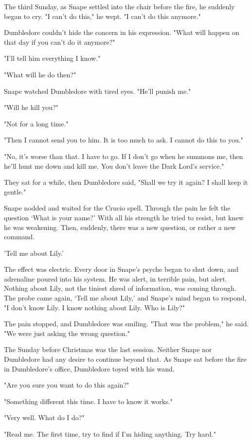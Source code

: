 \documentclass[a4paper,11pt]{article}
\begin{document}
The third Sunday, as Snape settled into the chair before the fire, he suddenly began to cry. "I can't do this," he wept. "I can't do this anymore."

Dumbledore couldn't hide the concern in his expression. "What will happen on that day if you can't do it anymore?"

"I'll tell him everything I know."

"What will he do then?"

Snape watched Dumbledore with tired eyes. "He'll punish me."

"Will he kill you?"

"Not for a long time."

"Then I cannot send you to him. It is too much to ask. I cannot do this to you."

"No, it's worse than that. I have to go. If I don't go when he summons me, then he'll hunt me down and kill me. You don't leave the Dark Lord's service."

They sat for a while, then Dumbledore said, "Shall we try it again? I shall keep it gentle."

Snape nodded and waited for the Crucio spell. Through the pain he felt the question `What is your name?' With all his strength he tried to resist, but knew he was weakening. Then, suddenly, there was a new question, or rather a new command.

'Tell me about Lily.'

The effect was electric. Every door in Snape's psyche began to shut down, and adrenaline poured into his system. He was alert, in terrible pain, but alert. Nothing about Lily, not the tiniest shred of information, was coming through. The probe came again, `Tell me about Lily,' and Snape's mind began to respond, "I don't know Lily. I know nothing about Lily. Who is Lily?"

The pain stopped, and Dumbledore was smiling. "That was the problem," he said. "We were just asking the wrong question."

The Sunday before Christmas was the last session. Neither Snape nor Dumbledore had any desire to continue beyond that. As Snape sat before the fire in Dumbledore's office, Dumbledore toyed with his wand.

"Are you sure you want to do this again?"

"Something different this time. I have to know it works."

"Very well. What do I do?"

"Read me. The first time, try to find if I'm hiding anything. Try hard."
\end{document}

